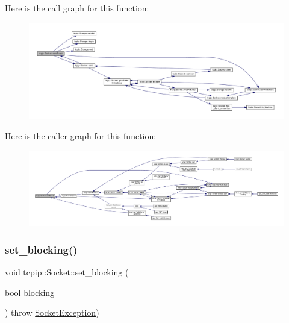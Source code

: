 Here is the call graph for this function\+:\nopagebreak
\begin{figure}[H]
\begin{center}
\leavevmode
\includegraphics[width=350pt]{classtcpip_1_1_socket_a6d00027b40f48d4ae19e3fff2e89f7ab_cgraph}
\end{center}
\end{figure}
Here is the caller graph for this function\+:\nopagebreak
\begin{figure}[H]
\begin{center}
\leavevmode
\includegraphics[width=350pt]{classtcpip_1_1_socket_a6d00027b40f48d4ae19e3fff2e89f7ab_icgraph}
\end{center}
\end{figure}
\mbox{\label{classtcpip_1_1_socket_ac382abc174bd18e4a61354cd857470c8}} 
\subsubsection{\texorpdfstring{set\+\_\+blocking()}{set\_blocking()}}
{\footnotesize\ttfamily void tcpip\+::\+Socket\+::set\+\_\+blocking (\begin{DoxyParamCaption}\item[{bool}]{blocking }\end{DoxyParamCaption}) throw  \hyperlink{classtcpip_1_1_socket_exception}{Socket\+Exception}) }

